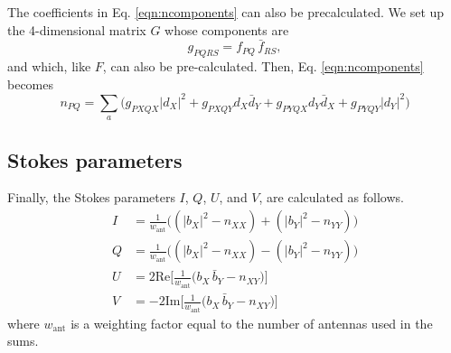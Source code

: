 \documentclass{article}
\begin{document}
The coefficients in Eq. \ref{eqn:ncomponents} can also be precalculated. We set up the 4-dimensional matrix $G$ whose components are
\begin{equation}
    g_{PQRS} = f_{PQ} \, \bar{f}_{RS},
\end{equation}
and which, like $F$, can also be pre-calculated. Then, Eq. \ref{eqn:ncomponents} becomes
\begin{equation}
    n_{PQ} = \sum_a \bigg(g_{PXQX} |d_X|^2 + g_{PXQY} d_X \bar{d}_Y + g_{PYQX} d_Y \bar{d}_X + g_{PYQY} |d_Y|^2 \bigg)
\end{equation}

\subsection{Stokes parameters}

Finally, the Stokes parameters $I$, $Q$, $U$, and $V$, are calculated as follows.
\begin{align}
    I &= \frac{1}{w_\text{ant}}\bigg((|b_X|^2 - n_{XX}) + (|b_Y|^2 - n_{YY})\bigg) \\
    Q &= \frac{1}{w_\text{ant}}\bigg((|b_X|^2 - n_{XX}) - (|b_Y|^2 - n_{YY})\bigg) \\
    U &=  2 \text{Re}\bigg[\frac{1}{w_\text{ant}}\bigg(b_X\,\bar{b}_Y - n_{XY}\bigg)\bigg]\\
    V &= -2 \text{Im}\bigg[\frac{1}{w_\text{ant}}\bigg(b_X\,\bar{b}_Y - n_{XY}\bigg)\bigg]
\end{align}
where $w_\text{ant}$ is a weighting factor equal to the number of antennas used in the sums.
\end{document}
